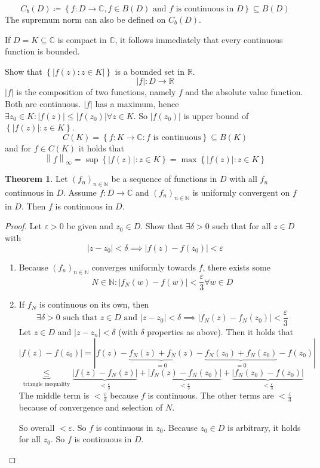 \documentclass[a4paper,landscape,twocolumn]{article}
\theoremstyle{definition}
\newtheorem{theorem}{Theorem}
\newcommand\set[1]{\left\{#1\right\}}
\newcommand\abs[1]{\left|#1\right|}
\newcommand\seq[1]{{\left(#1\right)}_{n \in \mathbb N}}
\newcommand\norm[1]{\left\|#1\right\|}
\begin{document}
\[ C_b(D) \coloneqq \set{f: D \to \mathbb C, f \in B(D) \text{ and } f \text{ is continuous in } D} \subseteq B(D) \]
The supremum norm can also be defined on $C_b(D)$.

If $D = K \subseteq \mathbb C$ is compact in $\mathbb C$,
it follows immediately that every continuous function is bounded.

Show that $\set{\abs{f(z): z \in K}}$ is a bounded set in $\mathbb R$.
\[ \abs{f}: D \to \mathbb R \]
$\abs{f}$ is the composition of two functions, namely $f$ and the absolute value
function. Both are continuous. $\abs{f}$ has a maximum, hence $\exists z_0 \in K:
\abs{f(z)} \leq \abs{f(z_0)} \forall z \in K$. So $\abs{f(z_0)}$ is upper bound of
$\set{\abs{f(z)}: z \in K}$.
\[ C(K) = \set{f: K \to \mathbb C: f \text{ is continuous}} \subseteq B(K) \]
and for $f \in C(K)$ it holds that
\[ \norm{f}_\infty = \sup\set{\abs{f(z)}: z \in K} = \max\set{\abs{f(z)}: z \in K} \]

\begin{theorem}
  Let $(f_n)_{n\in\mathbb N}$ be a sequence of functions in $D$ with all $f_n$ continuous in $D$.
  Assume $f: D \to \mathbb C$ and $(f_n)_{n \in \mathbb N}$ is uniformly convergent on $f$ in $D$.
  Then $f$ is continuous in $D$.
\end{theorem}
\begin{proof}
  Let $\varepsilon > 0$ be given and $z_0 \in D$.
  Show that $\exists \delta > 0$ such that for all $z \in D$ with
  \[ \abs{z - z_0} < \delta \implies \abs{f(z) - f(z_0)} < \varepsilon \]
  \begin{enumerate}
    \item Because $\seq{f_n}$ converges uniformly towards $f$, there exists some
      \[ N \in \mathbb N: \abs{f_N(w) - f(w)} < \frac\varepsilon3 \forall w \in D \]
    \item If $f_N$ is continuous on its own, then
      \[
        \exists \delta > 0 \text{ such that } z \in D \text{ and } \abs{z - z_0} < \delta \implies
        \abs{f_N(z) - f_N(z_0)} < \frac\varepsilon3
      \]
      Let $z \in D$ and $\abs{z - z_n} < \delta$ (with $\delta$ properties as above).
      Then it holds that
      \[
        \abs{f(z) - f(z_0)}
          = \abs{f(z) - \underbrace{f_N(z) + f_N(z)}_{=0}
          - \underbrace{f_N(z_0) + f_N(z_0)}_{=0} - f(z_0)}
      \]
      \[
        \underbrace{\leq}_{\text{triangle inequality}} \underbrace{\abs{f(z) - f_N(z)}}_{< \frac\varepsilon3}
        + \underbrace{\abs{f_N(z) - f_N(z_0)}}_{<\frac\varepsilon3}
        + \underbrace{\abs{f_N(z_0) - f(z_0)}}_{< \frac\varepsilon3}
      \]
      The middle term is $< \frac\varepsilon3$ because $f$ is continuous.
      The other terms are $< \frac\varepsilon3$ because of convergence and selection of $N$.

      So overall $< \varepsilon$. So $f$ is continuous in $z_0$.
      Because $z_0 \in D$ is arbitrary, it holds for all $z_0$. So $f$ is continuous in $D$.
  \end{enumerate}
\end{proof}
\end{document}
